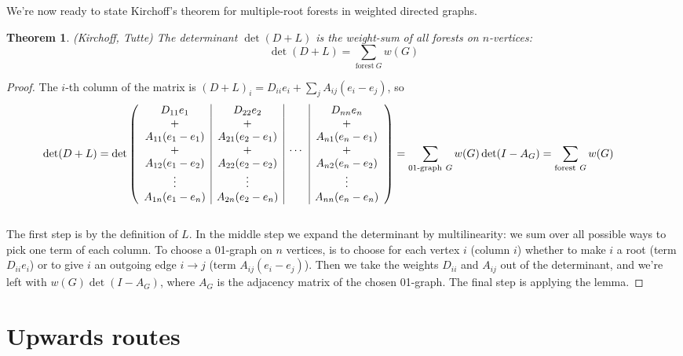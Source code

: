 \documentclass[a4paper, 11pt]{article}
\newtheorem{theorem}{Theorem}[section]
\theoremstyle{definition}
\begin{document}
\medskip
We're now ready to state Kirchoff's theorem for multiple-root forests in weighted directed graphs.

\begin{theorem} (Kirchoff, Tutte) The determinant $\det(D + L)$ is the weight-sum of all forests on $n$-vertices:
  \[
    \det(D + L) = \sum_{\text{forest}\ G} w(G)
  \]
\end{theorem}
\begin{proof}
  The $i$-th column of the matrix is $(D + L)_i = D_{ii} e_i + \sum_j A_{ij}(e_i - e_j)$, so \\
  \begin{align*}
    \hspace*{-1cm}
    \det(D + L) = \det \left(
    \begin{array}{c|c|c|c}
      D_{11} e_1         & D_{22} e_2         &        & D_{nn} e_n          \\
      +                  & +                  &        & +                   \\
      A_{11} (e_1 - e_1) & A_{21} (e_2 - e_1) &        & A_{n1} (e_n - e_1)  \\
      +                  & +                  & \cdots & +                   \\
      A_{12} (e_1 - e_2) & A_{22} (e_2 - e_2) &        & A_{n2} (e_n - e_2)  \\
      \vdots             & \vdots             &        & \vdots              \\
      A_{1n} (e_1 - e_n) & A_{2n} (e_2 - e_n) &        & A_{nn} (e_n - e_n)
    \end{array} \right)
    = \sum_{\text{01-graph}\ G} w(G) \det(I - A_G)
    = \sum_{\text{forest}\ G} w(G)
  \end{align*} \\
  The first step is by the definition of $L$. In the middle step we expand the determinant by multilinearity: we sum over all possible ways to pick one term of each column. To choose a 01-graph on $n$ vertices, is to choose for each vertex $i$ (column $i$) whether to make $i$ a root (term $D_{ii} e_i$) or to give $i$ an outgoing edge $i \to j$ (term $A_{ij}(e_i - e_j)$). Then we take the weights $D_{ii}$ and $A_{ij}$ out of the determinant, and we're left with $w(G)\det(I - A_G)$, where $A_G$ is the adjacency matrix of the chosen 01-graph. The final step is applying the lemma.
\end{proof}

\section{Upwards routes}
\end{document}
